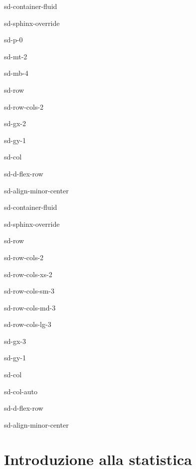 \documentclass[letterpaper,10pt,english]{jupyterBook}
\begin{document}
\begin{sphinxuseclass}{sd-container-fluid}
\begin{sphinxuseclass}{sd-sphinx-override}
\begin{sphinxuseclass}{sd-p-0}
\begin{sphinxuseclass}{sd-mt-2}
\begin{sphinxuseclass}{sd-mb-4}
\begin{sphinxuseclass}{sd-row}
\begin{sphinxuseclass}{sd-row-cols-2}
\begin{sphinxuseclass}{sd-gx-2}
\begin{sphinxuseclass}{sd-gy-1}
\begin{sphinxuseclass}{sd-col}
\begin{sphinxuseclass}{sd-d-flex-row}
\begin{sphinxuseclass}{sd-align-minor-center}
\begin{sphinxuseclass}{sd-container-fluid}
\begin{sphinxuseclass}{sd-sphinx-override}
\begin{sphinxuseclass}{sd-row}
\begin{sphinxuseclass}{sd-row-cols-2}
\begin{sphinxuseclass}{sd-row-cols-xs-2}
\begin{sphinxuseclass}{sd-row-cols-sm-3}
\begin{sphinxuseclass}{sd-row-cols-md-3}
\begin{sphinxuseclass}{sd-row-cols-lg-3}
\begin{sphinxuseclass}{sd-gx-3}
\begin{sphinxuseclass}{sd-gy-1}
\begin{sphinxuseclass}{sd-col}
\begin{sphinxuseclass}{sd-col-auto}
\begin{sphinxuseclass}{sd-d-flex-row}
\begin{sphinxuseclass}{sd-align-minor-center}
\end{sphinxuseclass}
\end{sphinxuseclass}
\end{sphinxuseclass}
\end{sphinxuseclass}
\end{sphinxuseclass}
\end{sphinxuseclass}
\end{sphinxuseclass}
\end{sphinxuseclass}
\end{sphinxuseclass}
\end{sphinxuseclass}
\end{sphinxuseclass}
\end{sphinxuseclass}
\end{sphinxuseclass}
\end{sphinxuseclass}
\end{sphinxuseclass}
\end{sphinxuseclass}
\end{sphinxuseclass}
\end{sphinxuseclass}
\end{sphinxuseclass}
\end{sphinxuseclass}
\end{sphinxuseclass}
\end{sphinxuseclass}
\end{sphinxuseclass}
\end{sphinxuseclass}
\end{sphinxuseclass}
\end{sphinxuseclass}

\chapter{Introduzione alla statistica}
\label{\detokenize{ch/statistics:introduzione-alla-statistica}}\label{\detokenize{ch/statistics:math-hs-statistics}}\label{\detokenize{ch/statistics::doc}}






\renewcommand{\indexname}{Index}
\printindex
\end{document}
